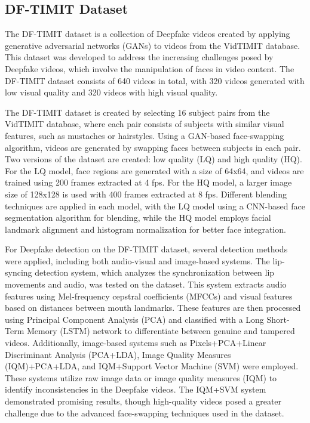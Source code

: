 \documentclass{article} %
\begin{document}
\subsection{DF-TIMIT Dataset}

The DF-TIMIT dataset is a collection of Deepfake videos created by applying generative adversarial networks (GANs) to videos from the VidTIMIT database. This dataset was developed to address the increasing challenges posed by Deepfake videos, which involve the manipulation of faces in video content. The DF-TIMIT dataset consists of 640 videos in total, with 320 videos generated with low visual quality and 320 videos with high visual quality\cite{Korshunov_2018}. 

The DF-TIMIT dataset is created by selecting 16 subject pairs from the VidTIMIT database, where each pair consists of subjects with similar visual features, such as mustaches or hairstyles. Using a GAN-based face-swapping algorithm, videos are generated by swapping faces between subjects in each pair. Two versions of the dataset are created: low quality (LQ) and high quality (HQ). For the LQ model, face regions are generated with a size of 64x64, and videos are trained using 200 frames extracted at 4 fps. For the HQ model, a larger image size of 128x128 is used with 400 frames extracted at 8 fps. Different blending techniques are applied in each model, with the LQ model using a CNN-based face segmentation algorithm for blending, while the HQ model employs facial landmark alignment and histogram normalization for better face integration\cite{Korshunov_2018}.

For Deepfake detection on the DF-TIMIT dataset, several detection methods were applied, including both audio-visual and image-based systems. The lip-syncing detection system, which analyzes the synchronization between lip movements and audio, was tested on the dataset. This system extracts audio features using Mel-frequency cepstral coefficients (MFCCs)\cite{Le_2016} and visual features based on distances between mouth landmarks. These features are then processed using Principal Component Analysis (PCA) and classified with a Long Short-Term Memory (LSTM) network to differentiate between genuine and tampered videos. Additionally, image-based systems such as Pixels+PCA+Linear Discriminant Analysis\cite{Wen_2015} (PCA+LDA), Image Quality Measures (IQM)\cite{Galbally_2014}+PCA+LDA, and IQM+Support Vector Machine (SVM) were employed. These systems utilize raw image data or image quality measures (IQM) to identify inconsistencies in the Deepfake videos. The IQM+SVM system demonstrated promising results, though high-quality videos posed a greater challenge due to the advanced face-swapping techniques used in the dataset.
\end{document}
